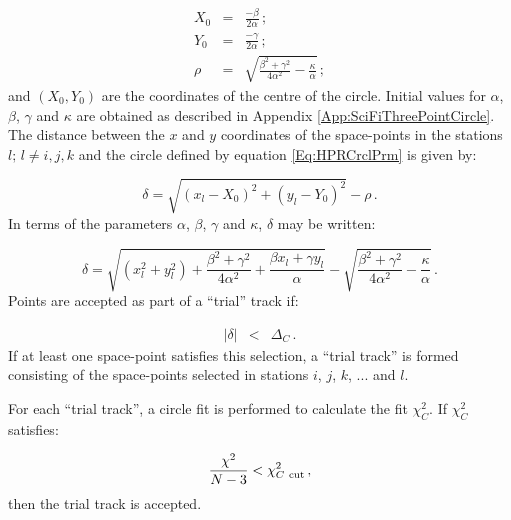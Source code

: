 \begin{eqnarray}
  X_0 & = & \frac{-\beta}{2 \alpha}                    \, ; \\
  Y_0 & = & \frac{-\gamma}{2 \alpha}                   \, ; \\
  \rho   & = & \sqrt{
                  \frac{\beta^2 + \gamma^2}{4 \alpha^2}
                  - \frac{\kappa}{\alpha}
                  } \, ;
\end{eqnarray}
and $(X_0, Y_0)$ are the coordinates of the centre of the circle. Initial values for $\alpha$, $\beta$, $\gamma$ and $\kappa$ are obtained as described in Appendix \ref{App:SciFiThreePointCircle}. The distance between the $x$ and $y$ coordinates of the space-points in the stations $l;\,l \ne i, j, k$ and the circle defined by equation \ref{Eq:HPRCrclPrm} is given by:

\begin{equation}
  \delta = \sqrt{(x_l-X_0)^2 + (y_l-Y_0)^2} - \rho \,.
\end{equation}
In terms of the parameters $\alpha$, $\beta$, $\gamma$ and $\kappa$, $\delta$ may be written:

\begin{equation}
  \delta = \sqrt{(x_l^2 + y_l^2)                       + 
                 \frac{\beta^2 + \gamma^2}{4 \alpha^2} +
                 \frac{\beta x_l + \gamma y_l}{\alpha}
           }                                            - 
           \sqrt{
                  \frac{\beta^2 + \gamma^2}{4 \alpha^2}
                  - \frac{\kappa}{\alpha}
                  }                                      \,.
\end{equation}
Points are accepted as part of a ``trial'' track if:

\begin{eqnarray}
  | \delta | & < & \Delta_C \, .
\end{eqnarray}
If at least one space-point satisfies this selection, a ``trial track'' is formed consisting of the space-points selected in stations $i$, $j$, $k$, ... and $l$.

For each ``trial track'', a circle fit is performed to calculate the fit $\chi_C^2$. If $\chi^2_C$ satisfies:

\begin{equation}
  \frac{\chi^2}{N-3} < \chi^2_{C~{\rm cut}} \,,
\end{equation}
then the trial track is accepted.

